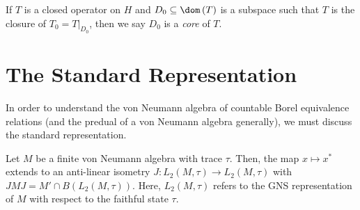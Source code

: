 \documentclass[10pt]{mypackage}
\begin{document}
If $T$ is a closed operator on $H$ and $D_0\subseteq \dom\left( T \right)$ is a subspace such that $T$ is the closure of $T_0 = T|_{D_0}$, then we say $D_0$ is a \textit{core} of $T$.
\section{The Standard Representation}%
In order to understand the von Neumann algebra of countable Borel equivalence relations (and the predual of a von Neumann algebra generally), we must discuss the standard representation.
\begin{proposition}
  Let $M$ be a finite von Neumann algebra with trace $\tau$. Then, the map $x\mapsto x^{\ast}$ extends to an anti-linear isometry $J\colon L_2\left( M,\tau \right)\rightarrow L_2\left( M,\tau \right)$ with $JMJ = M'\cap B\left( L_2\left( M,\tau \right) \right)$. Here, $L_2\left( M,\tau \right)$ refers to the GNS representation of $M$ with respect to the faithful state $\tau$.
\end{proposition}
\end{document}
